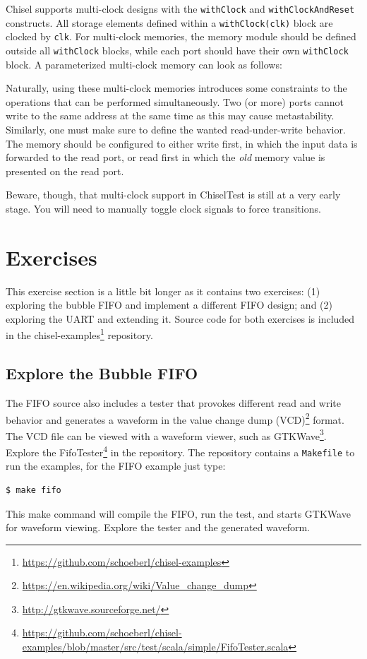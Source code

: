 \documentclass[%
    10pt,
    headinclude, footexclude,
    openright, %
    notitlepage,
    cleardoubleempty,
    headsepline,
    pointlessnumbers,
    bibtotoc, idxtotoc,
    ]{scrbook}
\newcommand{\code}[1]{{\small{\texttt{#1}}}}
\newcommand{\myref}[2]{\href{#1}{#2}}
\renewcommand{\myref}[2]{{#2}{\footnote{\url{#1}}}}
\begin{document}
Chisel supports multi-clock designs with the \code{withClock} and 
\code{withClockAndReset} constructs. All storage elements defined within a 
\code{withClock(clk)} block are clocked by \code{clk}. For multi-clock memories, 
the memory module should be defined outside all \code{withClock} blocks, while 
each port should have their own \code{withClock} block. A parameterized 
multi-clock memory can look as follows:


Naturally, using these multi-clock memories introduces some constraints to the 
operations that can be performed simultaneously. Two (or more) ports cannot 
write to the same address at the same time as this may cause metastability. 
Similarly, one must make sure to define the wanted read-under-write behavior.
The memory should be configured to either write first, in which the input data is 
forwarded to the read port, or read first in which the \emph{old} memory value 
is presented on the read port. 

Beware, though, that multi-clock support in ChiselTest is still at a very early 
stage. You will need to manually toggle clock signals to force transitions.


\section{Exercises}

This exercise section is a little bit longer as it contains two exercises:
(1) exploring the bubble FIFO and implement a different FIFO design;
and (2) exploring the UART and extending it.
Source code for both exercises is included in the
\myref{https://github.com/schoeberl/chisel-examples}{chisel-examples} repository.

\subsection{Explore the Bubble FIFO}

The FIFO source also includes a tester that provokes different read and write behavior and generates a waveform in the 
\myref{https://en.wikipedia.org/wiki/Value_change_dump}{value change dump (VCD)} format.
The VCD file can be viewed with a waveform viewer, such as
\myref{http://gtkwave.sourceforge.net/}{GTKWave}.
Explore the
\myref{https://github.com/schoeberl/chisel-examples/blob/master/src/test/scala/simple/FifoTester.scala}{FifoTester} in the repository.
The repository contains a \code{Makefile} to run the examples, for the FIFO example
just type:
\begin{verbatim}
$ make fifo
\end{verbatim}
This make command will compile the FIFO, run the test, and starts GTKWave for waveform
viewing. Explore the tester and the generated waveform.
\end{document}
